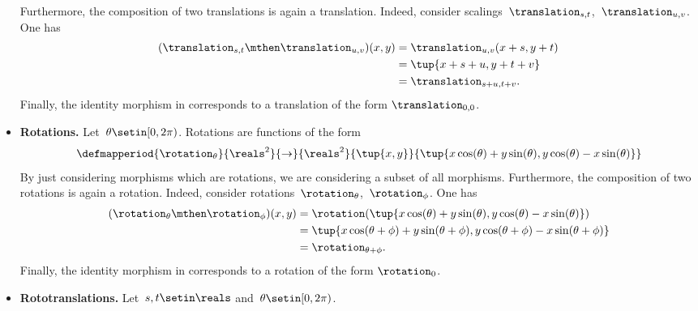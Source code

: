 \begin{solution}
\begin{itemize}
              Furthermore, the composition of two translations is again a translation.
              Indeed, consider scalings~$\translation_{s,t}$,~$\translation_{u,v}$.
              One has
              \begin{equation}
                  \begin{aligned}
                      (\translation_{s,t}\mthen \translation_{u,v})(x,y)
                       & =\translation_{u,v}(x+s, y+t) \\
                       & =\tup{x+s+u, y+t+v} \\
                       & =\translation_{s+u,t+v}.
                  \end{aligned}
              \end{equation}
              Finally, the identity morphism in \Draw corresponds to a translation of the form $\translation_{0,0}$.
        \item \textbf{Rotations.}
              Let~$\theta \setin [0,2\pi)$.
              Rotations are functions of the form
              \begin{equation}
                  \defmapperiod{\rotation_{\theta}}{\reals^2}{\to}{\reals^2}{\tup{x,y}}{\tup{x\cos(\theta)+y\sin(\theta), y\cos(\theta)-x\sin(\theta)}}
              \end{equation}
              By just considering morphisms which are rotations, we are considering a subset of all morphisms.
              Furthermore, the composition of two rotations is again a rotation.
              Indeed, consider rotations~$\rotation_{\theta}$,~$\rotation_{\phi}$.
              One has
              \begin{equation}
                  \begin{aligned}
                      (\rotation_{\theta}\mthen \rotation_{\phi})(x,y)
                       & =\rotation(\tup{x\cos(\theta)+y\sin(\theta), y\cos(\theta)-x\sin(\theta)}) \\
                       & =\tup{x\cos(\theta+\phi)+y\sin(\theta+\phi), y\cos(\theta+\phi)-x\sin(\theta+\phi)} \\
                       & =\rotation_{\theta+\phi}.
                  \end{aligned}
              \end{equation}
              Finally, the identity morphism in \Draw corresponds to a rotation of the form $\rotation_{0}$.
        \item \textbf{Rototranslations.}
              Let~$s,t\setin \reals$ and~$\theta \setin [0,2\pi)$.

\end{itemize}
\end{solution}
